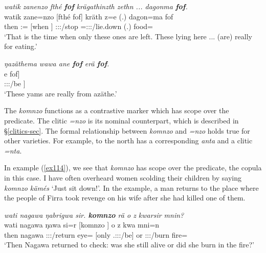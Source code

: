 \begin{exe}
	\ex \emph{watik zanenzo fthé \textbf{fof} krägathinzth zethn ... dagonma \textbf{fof}.}\\
	\gll watik zane=nzo [fthé fof] kräth z=e (.) dagon=ma fof\\
	then {\Dem}:{\Prox}={\Only} [when {\Emph}] \Stpl:\Sbj:\Irr:\Pfv/stop \Prox=\Stpl:\Sbj:\Nonpast:\Stat/lie.down (.) food={\Char} {\Emph}\\
	\trans `That is the time when only these ones are left. These lying here ... (are) really for eating.' 
	\label{ex112}
\end{exe}
\begin{exe}
	\ex \emph{ŋazäthema wawa ane \textbf{fof} erä \textbf{fof}.}\\
	\gll [ŋazäthe=ma [wawa ane fof] e fof]\\
	[ŋazäthe={\Char} [yam {\Dem} {\Emph}] \Stpl:\Sbj:\Nonpast:\Ipfv/be {\Emph}]\\
	\trans `These yams are really from \NG{}azäthe.' 
	\label{ex113}
\end{exe}

The  \emph{komnzo} functions as a contrastive  marker which has scope over the predicate. The clitic \emph{=nzo} is its nominal counterpart, which is described in {\S}\ref{clitics-sec}. The formal relationship between \emph{komnzo} and \emph{=nzo} holds true for other  varieties. For example,  to the north has a corresponding  \emph{anta} and a clitic \emph{=nta}.

In example (\ref{ex114}), we see that \emph{komnzo} has scope over the predicate, the copula in this case. I have often overheard women scolding their children by saying \emph{komnzo kämés} `Just sit down!'. In the example, a man returns to the place where the people of Firra took revenge on his wife after she had killed one of them.

\begin{exe}
	\ex	\emph{wati nagawa ŋabrigwa sir. \textbf{komnzo} rä o z kwarsir mnin?}\\
	\gll wati nagawa ŋawa si=r [komnzo ] o z kwa mni=n\\
	then nagawa \Stsg:\Sbj:\Pst:\Ipfv/return eye={\Purp} [only \Tsg.\F:\Sbj:\Nonpast:\Ipfv/be] or {\Iam} \Stsg:\Sbj:\Rpst:\Ipfv/burn fire={\Loc}\\
	\trans `Then Nagawa returned to check: was she still alive or did she burn in the fire?' 
	\label{ex114}
\end{exe}

